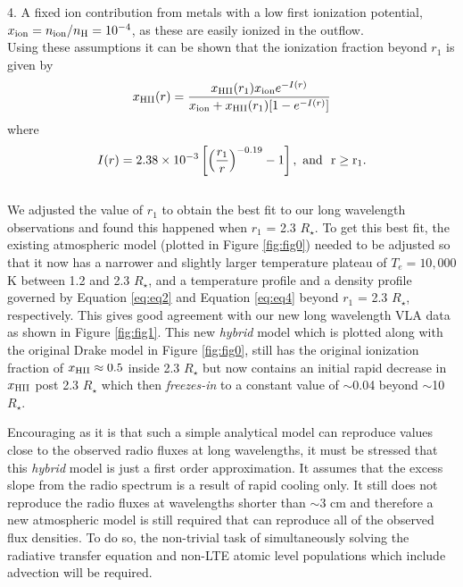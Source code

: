 \documentclass[iop]{emulateapj}
\begin{document}
4. A fixed ion contribution from metals with a low first ionization potential, $x_{\rm{ion}}=n_{\rm{ion}}/n_{\rm{H}}=10^{-4}$, as these are easily ionized in the outflow.\\
Using these assumptions it can be shown that the ionization fraction beyond $r_{1}$ is given by \citep{1986ApJ...306..605G}
\begin{equation}
x_{\rm{HII}}(r)= \frac{x_{\rm{HII}}(r_1)x_{\rm{ion}}e^{-I(r)}}{x_{\rm{ion}}+x_{\rm{HII}}(r_1)[1 - e^{-I(r)}]}
\label{eq:eq4}
\end{equation}
where
\begin{equation}
I(r) = 2.38 \times 10^{-3} \left[\left( \frac{r_{1}}{r}\right)^{-0.19} -1 \right], \ \rm{and} \ \  r \geq r_{1}.
\label{eq:eq5}
\end{equation}
\\

We adjusted the value of $r_{1}$ to obtain the best fit to our long wavelength observations and found this happened when $r_{1}$ = 2.3 $R_{\star}$. To get this best fit, the existing atmospheric model (plotted in Figure \ref{fig:fig0}) needed to be adjusted so that it now has a narrower and slightly larger temperature plateau of $T_e = 10,000$ K between 1.2 and 2.3 $R_{\star}$, and a temperature profile and a density profile governed by Equation \ref{eq:eq2} and Equation \ref{eq:eq4} beyond $r_{1}$ = 2.3 $R_{\star}$, respectively. This gives good agreement with our new long wavelength VLA data as shown in Figure \ref{fig:fig1}. This new \textit{hybrid} model which is plotted along with the original Drake model in Figure \ref{fig:fig0}, still has the original ionization fraction of $x_{\rm{HII}} \approx 0.5$ inside 2.3 $R_{\star}$ but now contains an initial rapid decrease in $x_{\rm{HII}}$ post 2.3 $R_{\star}$ which then \textit{freezes-in} to a constant value of $\sim$0.04 beyond $\sim$10 $R_{\star}$.

Encouraging as it is that such a simple analytical model can reproduce values close to the observed radio fluxes at long wavelengths, it must be stressed that this \textit{hybrid} model is just a first order approximation. It assumes that the excess slope from the radio spectrum is a result of rapid cooling only. It still does not reproduce the radio fluxes at wavelengths shorter than $\sim$3 cm and therefore a new atmospheric model is still required that can reproduce all of the observed flux densities. To do so, the non-trivial task of simultaneously solving the radiative transfer equation and non-LTE atomic level populations which include advection will be required.
\end{document}
